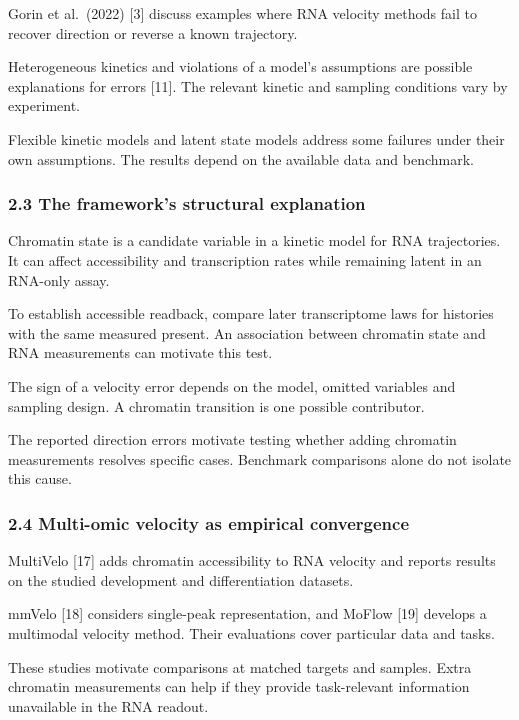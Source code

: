 \documentclass[
]{article}
\begin{document}
Gorin et al.~(2022) {[}3{]} discuss examples where RNA velocity methods
fail to recover direction or reverse a known trajectory.

Heterogeneous kinetics and violations of a model's assumptions are
possible explanations for errors {[}11{]}. The relevant kinetic and
sampling conditions vary by experiment.

Flexible kinetic models and latent state models address some failures
under their own assumptions. The results depend on the available data
and benchmark.

\hypertarget{the-frameworks-structural-explanation}{%
\subsubsection{2.3 The framework's structural
explanation}\label{the-frameworks-structural-explanation}}

Chromatin state is a candidate variable in a kinetic model for RNA
trajectories. It can affect accessibility and transcription rates while
remaining latent in an RNA-only assay.

To establish accessible readback, compare later transcriptome laws for
histories with the same measured present. An association between
chromatin state and RNA measurements can motivate this test.

The sign of a velocity error depends on the model, omitted variables and
sampling design. A chromatin transition is one possible contributor.

The reported direction errors motivate testing whether adding chromatin
measurements resolves specific cases. Benchmark comparisons alone do not
isolate this cause.

\hypertarget{multi-omic-velocity-as-empirical-convergence}{%
\subsubsection{2.4 Multi-omic velocity as empirical
convergence}\label{multi-omic-velocity-as-empirical-convergence}}

MultiVelo {[}17{]} adds chromatin accessibility to RNA velocity and
reports results on the studied development and differentiation datasets.

mmVelo {[}18{]} considers single-peak representation, and MoFlow
{[}19{]} develops a multimodal velocity method. Their evaluations cover
particular data and tasks.

These studies motivate comparisons at matched targets and samples. Extra
chromatin measurements can help if they provide task-relevant
information unavailable in the RNA readout.
\end{document}
